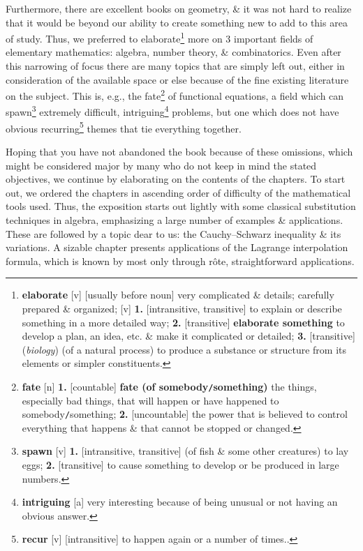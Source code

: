 \documentclass[oneside]{book}
\numberwithin{equation}{section}
\begin{document}
Furthermore, there are excellent books on geometry, \& it was not hard to realize that it would be beyond our ability to create something new to add to this area of study. Thus, we preferred to elaborate\footnote{\textbf{elaborate} [v] [usually before noun] very complicated \& details; carefully prepared \& organized; [v] \textbf{1.} [intransitive, transitive] to explain or describe something in a more detailed way; \textbf{2.} [transitive] \textbf{elaborate something} to develop a plan, an idea, etc. \& make it complicated or detailed; \textbf{3.} [transitive] (\textit{biology}) (of a natural process) to produce a substance or structure from its elements or simpler constituents.} more on 3 important fields of elementary mathematics: algebra, number theory, \& combinatorics. Even after this narrowing of focus there are many topics that are simply left out, either in consideration of the available space or else because of the fine existing literature on the subject. This is, e.g., the fate\footnote{\textbf{fate} [n] \textbf{1.} [countable] \textbf{fate (of somebody\texttt{/}something)} the things, especially bad things, that will happen or have happened to somebody\texttt{/}something; \textbf{2.} [uncountable] the power that is believed to control everything that happens \& that cannot be stopped or changed.} of functional equations, a field which can spawn\footnote{\textbf{spawn} [v] \textbf{1.} [intransitive, transitive] (of fish \& some other creatures) to lay eggs; \textbf{2.} [transitive] to cause something to develop or be produced in large numbers.} extremely difficult, intriguing\footnote{\textbf{intriguing} [a] very interesting because of being unusual or not having an obvious answer.} problems, but one which does not have obvious recurring\footnote{\textbf{recur} [v] [intransitive] to happen again or a number of times..} themes that tie everything together.

Hoping that you have not abandoned the book because of these omissions, which might be considered major by many who do not keep in mind the stated objectives, we continue by elaborating on the contents of the chapters. To start out, we ordered the chapters in ascending order of difficulty of the mathematical tools used. Thus, the exposition starts out lightly with some classical substitution techniques in algebra, emphasizing a large number of examples \& applications. These are followed by a topic dear to us: the Cauchy--Schwarz inequality \& its variations. A sizable chapter presents applications of the Lagrange interpolation formula, which is known by most only through r\^ote, straightforward applications.
\end{document}
